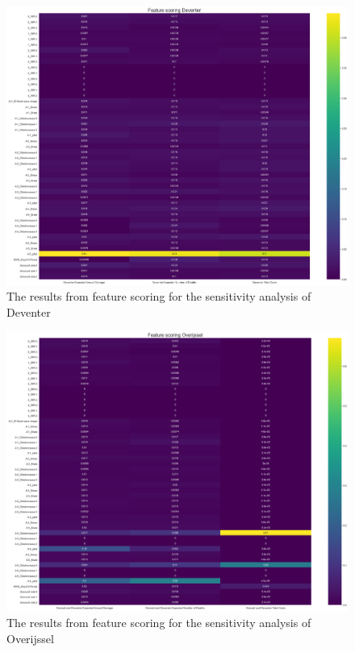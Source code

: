 \begin{figure}[h!]
    \centering
    \includegraphics[width=\textwidth]{report/figures/results/Feature_scoring_Deventer_100scen.png}
    \caption{The results from feature scoring for the sensitivity analysis of Deventer}
    \label{fig:feat-scor-d}
\end{figure}

\begin{figure}[h!]
    \centering
    \includegraphics[width=\textwidth]{report/figures/results/Feature_scoring_Overijssel_100scen.png}
    \caption{The results from feature scoring for the sensitivity analysis of Overijssel}
    \label{fig:feat-scor-o}
\end{figure}

